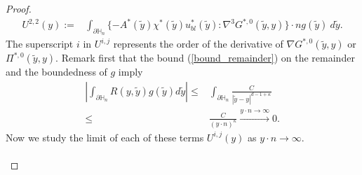 \documentclass[11pt, reqno]{amsart}
\theoremstyle{definition}
\theoremstyle{remark}
\numberwithin{equation}{section}
\begin{document}
\begin{proof}[Proof]
\begin{align*}
			U^{2,2}(y):=&\int_{\partial\mathbb{H}_n}  \{-A^*(\tilde{y}) \chi^*\left(\tilde{y} \right) u_{bl}^*\left(\tilde{y} \right):\nabla^3 G^{*,0}\left(\tilde{y},y \right) \}\cdot n g(\tilde{y})   \  d\tilde{y}.   
		\end{align*}	
		The superscript $i$ in $U^{i,j}$ represents the order of the derivative of $\nabla G^{*,0}(\tilde{y}, y)$ or $\Pi^{*,0}( \tilde{y}, y)$.
	 Remark first that 
		the bound (\ref{bound_remainder}) on the remainder and the boundedness of $g$ imply 
		\begin{align*}
			\left| \int_{\partial\mathbb{H}_n} R(y,\tilde{y}) g(\tilde{y}) d\tilde{y} \right| \leq & \int_{\partial\mathbb{H}_n}  \frac{C}{|\tilde{y}-y|^{d-1+\kappa}} \\ \leq& \frac{C}{(y\cdot n)^\kappa} \stackrel{y\cdot n \rightarrow \infty}{ \longrightarrow } 0.
		\end{align*}
		Now we study the limit of each of these terms $U^{i,j}(y)$ as $y\cdot n \rightarrow \infty.$ \\
		
		
		\\
		

\end{proof}
\end{document}
